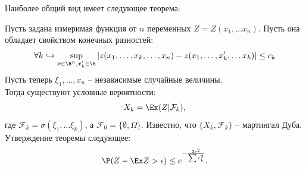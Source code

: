 Наиболее общий вид имеет следующее теорема:
\begin{theorem}
    Пусть задана измеримая функция от $n$ переменных $Z = Z(x_1, \ldots x_n)$.
    Пусть она обладает свойством конечных разностей:
    \[
        \forall k \hookrightarrow \sup\limits_{x \in \R^n, x_k' \in \R} |z(x_1, \ldots, x_k, \ldots, x_n) - z(x_1, \ldots, x_k', \ldots x_k)| \leq c_k
    \]
    Пусть теперь $\xi_1, \ldots, x_n$ -- независимые случайные величины. \\
    Тогда существуют условные вероятности:
    \[
        X_k = \Ex(Z|\mathcal{F}_k),
    \]
    где $\mathcal{F}_{k} = \sigma(\xi_1, \ldots \xi_k)$, а $\mathcal{F}_0 = \{\emptyset, \Omega\}$.
    Известно, что $\{X_k, \mathcal{F}_k\}$ -- мартингал Дуба. \\
    Утверждение теоремы следующее:
    \[
        \P(Z - \Ex Z > \epsilon) \leq e^{-\frac{2 \epsilon^2}{\sum c_k^2}}.
    \]
\end{theorem}
